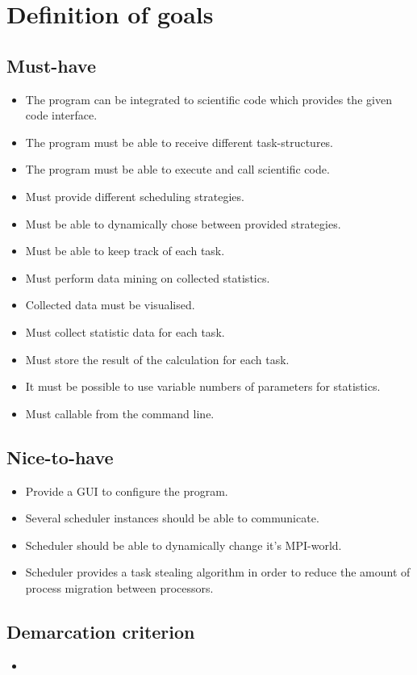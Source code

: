 \section{Definition of goals}
	\subsection{Must-have}
		\begin{itemize}
			\item The program can be integrated to scientific code which provides the given code interface.
			\item The program must be able to receive different task-structures.
			\item The program must be able to execute and call scientific code.
			\item Must provide different scheduling strategies.
			\item Must be able to dynamically chose between provided strategies.
			\item Must be able to keep track of each task.
			\item Must perform data mining on collected statistics.
			\item Collected data must be visualised.
			\item Must collect statistic data for each task.
			\item Must store the result of the calculation for each task.
			\item It must be possible to use variable numbers of parameters for statistics.
			\item Must callable from the command line.
		\end{itemize}
	\subsection{Nice-to-have}
		\begin{itemize}
			\item Provide a GUI to configure the program.
			\item Several scheduler instances should be able to communicate.
			\item Scheduler should be able to dynamically change it's MPI-world.
			\item Scheduler provides a task stealing algorithm in order to reduce the amount of process migration between processors.
		\end{itemize}
	\subsection{Demarcation criterion}
		\begin{itemize}
			\item
		\end{itemize}
